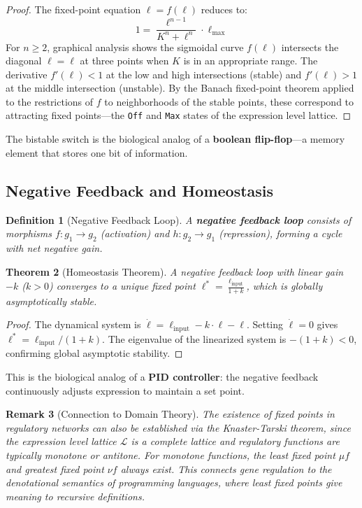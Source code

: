 \documentclass[12pt,a4paper]{article}
\newtheorem{theorem}{Theorem}[section]
\newtheorem{definition}[theorem]{Definition}
\newtheorem{remark}[theorem]{Remark}
\begin{document}
\begin{proof}
The fixed-point equation $\ell = f(\ell)$ reduces to:
\[
1 = \frac{\ell^{n-1}}{K^n + \ell^n} \cdot \ell_{\max}
\]
For $n \geq 2$, graphical analysis shows the sigmoidal curve $f(\ell)$ intersects the diagonal $\ell = \ell$ at three points when $K$ is in an appropriate range.  The derivative $f'(\ell) < 1$ at the low and high intersections (stable) and $f'(\ell) > 1$ at the middle intersection (unstable).  By the Banach fixed-point theorem applied to the restrictions of $f$ to neighborhoods of the stable points, these correspond to attracting fixed points---the \texttt{Off} and \texttt{Max} states of the expression level lattice.
\end{proof}

The bistable switch is the biological analog of a \textbf{boolean flip-flop}---a memory element that stores one bit of information.

\subsection{Negative Feedback and Homeostasis}

\begin{definition}[Negative Feedback Loop]\label{def:negative-feedback}
A \textbf{negative feedback loop} consists of morphisms $f : g_1 \to g_2$ (activation) and $h : g_2 \to g_1$ (repression), forming a cycle with net negative gain.
\end{definition}

\begin{theorem}[Homeostasis Theorem]\label{thm:homeostasis}
A negative feedback loop with linear gain $-k$ ($k > 0$) converges to a unique fixed point $\ell^* = \frac{\ell_{\text{input}}}{1 + k}$, which is globally asymptotically stable.
\end{theorem}

\begin{proof}
The dynamical system is $\dot{\ell} = \ell_{\text{input}} - k \cdot \ell - \ell$.  Setting $\dot{\ell} = 0$ gives $\ell^* = \ell_{\text{input}} / (1+k)$.  The eigenvalue of the linearized system is $-(1+k) < 0$, confirming global asymptotic stability.
\end{proof}

This is the biological analog of a \textbf{PID controller}: the negative feedback continuously adjusts expression to maintain a set point.

\begin{remark}[Connection to Domain Theory]
The existence of fixed points in regulatory networks can also be established via the Knaster-Tarski theorem, since the expression level lattice $\mathcal{L}$ is a complete lattice and regulatory functions are typically monotone or antitone.  For monotone functions, the least fixed point $\mu f$ and greatest fixed point $\nu f$ always exist.  This connects gene regulation to the denotational semantics of programming languages, where least fixed points give meaning to recursive definitions.
\end{remark}
\end{document}
